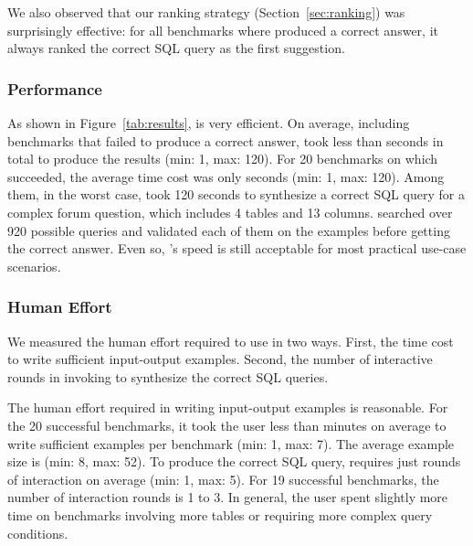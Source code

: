 We also observed that our ranking strategy (Section~\ref{sec:ranking})
was surprisingly effective: for all benchmarks where
\ourtool produced a correct answer, it always ranked the correct
SQL query as the first suggestion.

%

\subsubsection{Performance}
\label{sec:performance}

As shown in Figure~\ref{tab:results}, \ourtool
is very efficient.
On average,
including benchmarks that \ourtool failed to produce
a correct answer,
\ourtool took less than \avgtime seconds in total to
produce the results (min: 1, max: 120).
For 20 benchmarks on which \ourtool succeeded, the average
time cost was only \avgsucctime seconds (min: 1, max: 120). 
Among them, in the worst case, \ourtool took 120 seconds to synthesize a
correct SQL query for a complex forum question, which includes 4 tables
and 13 columns. \ourtool searched over 920 possible
queries and validated each of them on the examples before getting
the correct answer. Even so, \ourtool's speed is still acceptable
for most practical use-case scenarios.






\subsubsection{Human Effort}
\label{sec:human}

We measured the human effort required to use \ourtool in two ways.
First, the time cost to write sufficient input-output examples. Second,
the number of interactive rounds in invoking \ourtool
to synthesize the correct SQL queries.

The human effort required in writing
input-output examples is reasonable. For
the 20 successful benchmarks, it took the user less than
\avgsucchum minutes on average to write sufficient examples
per benchmark (min: 1, max: 7). The
average example size is \avgsucctuple
(min: 8, max: 52).
To produce the correct SQL query,
\ourtool requires just \avgsuccround rounds of
interaction on average (min: 1, max: 5).
For 19 successful benchmarks, the number of interaction
rounds is 1 to 3. In general, the user
spent slightly more time on benchmarks involving
more tables or requiring more complex query conditions.

